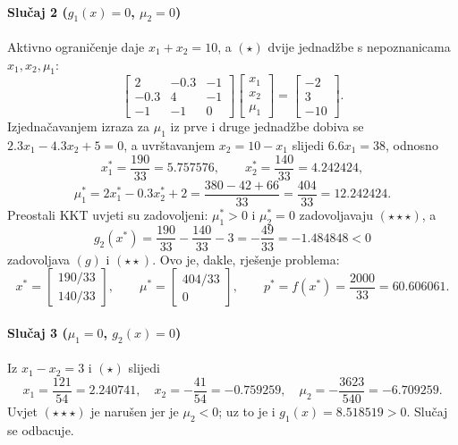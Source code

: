 \paragraph{Slučaj 2 ($g_1(x) = 0$, $\mu_2 = 0$)}
Aktivno ograničenje daje $x_1 + x_2 = 10$, a $(\star)$ dvije jednadžbe s nepoznanicama $x_1, x_2, \mu_1$:
\begin{equation}
\begin{bmatrix} 2 & -0.3 & -1 \\ -0.3 & 4 & -1 \\ -1 & -1 & 0 \end{bmatrix}
\begin{bmatrix} x_1 \\ x_2 \\ \mu_1 \end{bmatrix}
= \begin{bmatrix} -2 \\ 3 \\ -10 \end{bmatrix}.
\end{equation}
Izjednačavanjem izraza za $\mu_1$ iz prve i druge jednadžbe dobiva se $2.3x_1 - 4.3x_2 + 5 = 0$, a uvrštavanjem $x_2 = 10 - x_1$ slijedi $6.6 x_1 = 38$, odnosno
\begin{equation}
x_1^* = \frac{190}{33} = 5.757576, \qquad x_2^* = \frac{140}{33} = 4.242424,
\end{equation}
\begin{equation}
\mu_1^* = 2x_1^* - 0.3x_2^* + 2 = \frac{380 - 42 + 66}{33} = \frac{404}{33} = 12.242424.
\end{equation}
Preostali KKT uvjeti su zadovoljeni: $\mu_1^* > 0$ i $\mu_2^* = 0$ zadovoljavaju $(\star\star\star)$, a
\begin{equation}
g_2(x^*) = \frac{190}{33} - \frac{140}{33} - 3 = -\frac{49}{33} = -1.484848 < 0
\end{equation}
zadovoljava $(g)$ i $(\star\star)$. Ovo je, dakle, rješenje problema:
\begin{equation}
x^* = \begin{bmatrix} 190/33 \\ 140/33 \end{bmatrix}, \qquad
\mu^* = \begin{bmatrix} 404/33 \\ 0 \end{bmatrix}, \qquad
p^* = f(x^*) = \frac{2000}{33} = 60.606061.
\label{eq:qp_rjesenje}
\end{equation}

\paragraph{Slučaj 3 ($\mu_1 = 0$, $g_2(x) = 0$)}
Iz $x_1 - x_2 = 3$ i $(\star)$ slijedi
\begin{equation}
x_1 = \frac{121}{54} = 2.240741, \quad x_2 = -\frac{41}{54} = -0.759259, \quad \mu_2 = -\frac{3623}{540} = -6.709259.
\end{equation}
Uvjet $(\star\star\star)$ je narušen jer je $\mu_2 < 0$; uz to je i $g_1(x) = 8.518519 > 0$. Slučaj se odbacuje.

